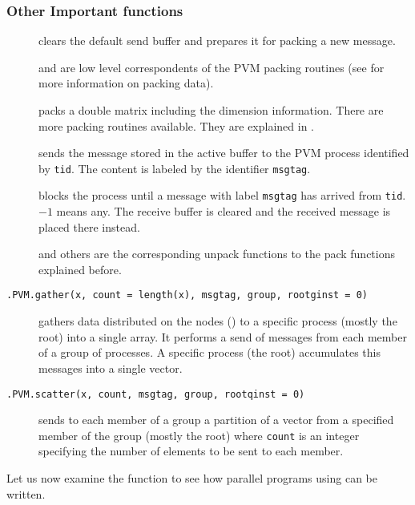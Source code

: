 \subsubsection{Other Important functions}
\begin{description}
\item[] clears the default send buffer and
  prepares it for packing a new message.
\item[] and  are low level correspondents of the PVM packing
    routines (see \cite{geist94pvm} for more information on packing
    data). 
\item[] packs a double matrix including
  the dimension information. There are more packing routines
  available. They are explained in \cite{nali07rpvm}.
\item[] sends the message stored in the
  active buffer to the PVM process identified by \texttt{tid}. The
  content is labeled by the identifier \texttt{msgtag}.
\item[] blocks the process
  until a message with label \texttt{msgtag} has arrived from
  \texttt{tid}. $-1$ means any. The receive buffer is cleared
  and the received message is placed there instead.
\item[] and
  others are the corresponding unpack functions to the
  pack functions explained before.
\item[\texttt{.PVM.gather(x, count = length(x), msgtag, group,
    rootginst = 0)}] gathers data distributed on the nodes ()
  to a 
  specific process (mostly the root) into a single array. It performs
  a send of messages from each member of a group of processes. A
  specific process (the root) accumulates this messages into a single
  vector. 
\item[\texttt{.PVM.scatter(x, count, msgtag, group, rootqinst = 0)}]
  sends to each member of a group a partition of  a vector 
  from a 
  specified member of the group (mostly the root) where \texttt{count}
  is an integer specifying the number of elements to be sent to each
  member. 
\end{description}

Let us now examine the function to see how parallel programs using
 can be written.

